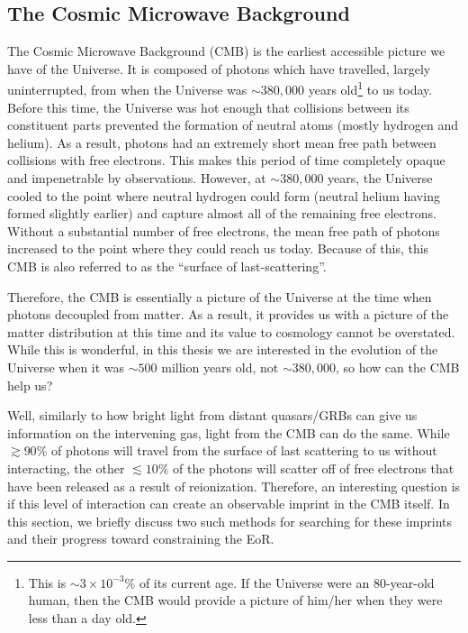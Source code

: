 \subsection{The Cosmic Microwave Background}\label{sec:CMB}


The Cosmic Microwave Background (CMB) is the earliest accessible picture we have of the Universe. It is composed of photons which have travelled, largely uninterrupted, from when the Universe was $\sim380,000$ years old\footnote{This is $\sim3\times 10^{-3}\%$ of its current age. If the Universe were an 80-year-old human, then the CMB would provide a picture of him/her when they were less than a day old.} to us today. Before this time, the Universe was hot enough that collisions between its constituent parts prevented the formation of neutral atoms (mostly hydrogen and helium). As a result, photons had an extremely short mean free path between collisions with free electrons. This makes this period of time completely opaque and impenetrable by observations. However, at $\sim380,000$ years, the Universe cooled to the point where neutral hydrogen could form (neutral helium having formed slightly earlier) and capture almost all of the remaining free electrons. Without a substantial number of free electrons, the mean free path of photons increased to the point where they could reach us today. Because of this, this CMB is also referred to as the ``surface of last-scattering''.


Therefore, the CMB is essentially a picture of the Universe at the time when photons decoupled from matter. As a result, it provides us with a picture of the matter distribution at this time and its value to cosmology cannot be overstated. While this is wonderful, in this thesis we are interested in the evolution of the Universe when it was $\sim500$ million years old, not $\sim380,000$, so how can the CMB help us? 


Well, similarly to how bright light from distant quasars/GRBs can give us information on the intervening gas, light from the CMB can do the same. While $\gtrsim90\%$ of photons will travel from the surface of last scattering to us without interacting, the other $\lesssim10\%$ of the photons will scatter off of free electrons that have been released as a result of reionization. Therefore, an interesting question is if this level of interaction can create an observable imprint in the CMB itself. In this section, we briefly discuss two such methods for searching for these imprints and their progress toward constraining the EoR.


